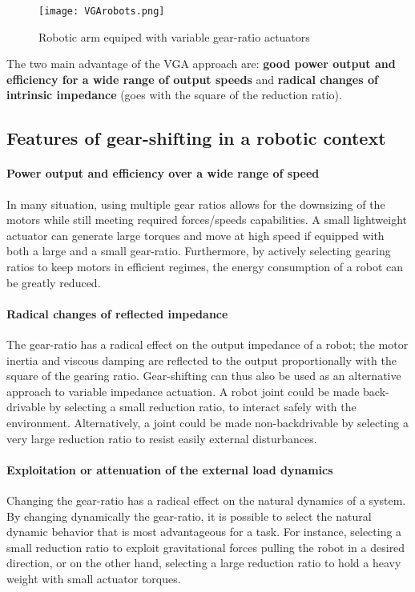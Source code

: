 \begin{figure}[htb]
        \centering
				\texttt{[image: VGArobots.png]}
        \caption{Robotic arm equiped with variable gear-ratio actuators}\label{fig:vgarobots}
\end{figure}


The two main advantage of the VGA approach are: \textbf{good power output and efficiency for a wide range of output speeds} and \textbf{radical changes of intrinsic impedance} (goes with the square of the reduction ratio). 

\subsection{Features of gear-shifting in a robotic context}

\paragraph{Power output and efficiency over a wide range of speed}
In many situation, using multiple gear ratios allows for the downsizing of the motors while still meeting required forces/speeds capabilities. A small lightweight actuator can generate large torques and move at high speed if equipped with both a large and a small gear-ratio. Furthermore, by actively selecting gearing ratios to keep motors in efficient regimes, the energy consumption of a robot can be greatly reduced. 

\paragraph{Radical changes of reflected impedance}
The gear-ratio has a radical effect on the output impedance of a robot; the motor inertia and viscous damping are reflected to the output proportionally with the square of the gearing ratio. Gear-shifting can thus also be used as an alternative approach to variable impedance actuation. A robot joint could be made back-drivable by selecting a small reduction ratio, to interact safely with the environment.  Alternatively, a joint could be made non-backdrivable by selecting a very large reduction ratio to resist easily external disturbances.

\paragraph{Exploitation or attenuation of the external load dynamics}
Changing the gear-ratio has a radical effect on the natural dynamics of a system. By changing dynamically the gear-ratio, it is possible to select the natural dynamic behavior that is most advantageous for a task. For instance, selecting a small reduction ratio to exploit gravitational forces pulling the robot in a desired direction, or on the other hand, selecting a large reduction ratio to hold a heavy weight with small actuator torques.

